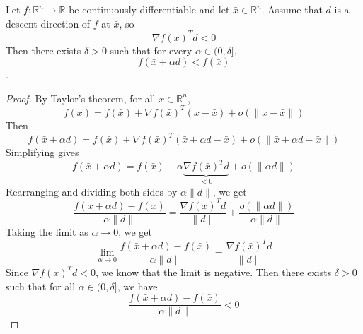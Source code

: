 \begin{theorem}
  Let $f: \mathbb R^n \to \mathbb R$ be continuously differentiable and let $\bar x \in \mathbb R^n$. Assume that $d$ is a descent direction of $f$ at $\bar x$, so $$\nabla f(\bar x)^T d < 0$$ Then there exists $\delta > 0$ such that for every $\alpha \in (0, \delta]$, 
  $$f(\bar x + \alpha d) < f(\bar x)$$.
\end{theorem}
\begin{proof}[Proof]
  By Taylor's theorem, for all $x \in \mathbb R^n$, 
  $$f(x) = f(\bar x) + \nabla f(\bar x)^T (x - \bar x) + o(\|x - \bar x\|)$$
  Then
  $$f(\bar x + \alpha d) = f(\bar x) + \nabla f(\bar x)^T (\bar x + \alpha d - \bar x) + o(\|\bar x + \alpha d - \bar x\|)$$
  Simplifying gives
  $$f(\bar x + \alpha d) = f(\bar x) + \alpha \underbrace{\nabla f(\bar x)^T d}_{< 0} + o(\|\alpha d\|)$$ Rearranging and dividing both sides by $\alpha \|d\|$, we get
  $$\frac{f(\bar x + \alpha d) - f(\bar x)}{\alpha \|d\|} = \frac{\nabla f(\bar x)^T d}{\|d\|} + \frac{o(\|\alpha d\|)}{\alpha \|d\|}$$
  Taking the limit as $\alpha \to 0$, we get
  $$\lim_{\alpha \to 0} \frac{f(\bar x + \alpha d) - f(\bar x)}{\alpha \|d\|} = \frac{\nabla f(\bar x)^T d}{\|d\|}$$
  Since $\nabla f(\bar x)^T d < 0$, we know that the limit is negative. Then there exists $\delta > 0$ such that for all $\alpha \in (0, \delta]$, we have
  $$\frac{f(\bar x + \alpha d) - f(\bar x)}{\alpha \|d\|} < 0$$
\end{proof}

